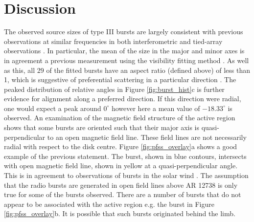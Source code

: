 
\section{Discussion}
\label{sec:obsvtheory_discussion}
The observed source sizes of type III bursts are largely consistent with previous observations at similar frequencies in both interferometric and tied-array observations \citep{Kontar2017, Zhang2020}. In particular, the mean of the size in the major and minor axes is in agreement a previous measurement using the visibility fitting method \citep{Murphy2021}. As well as this, all 29 of the fitted bursts have an aspect ratio (defined above) of less than 1, which is suggestive of preferential scattering in a particular direction \citep{Anantharamaiah1994, Bastian1994}. The peaked distribution of relative angles in Figure \ref{fig:burst_hist}c is further evidence for alignment along a preferred direction. If this direction were radial, one would expect a peak around $0^\circ$ however here a mean value of $-18.33^\circ$ is observed. An examination of the magnetic field structure of the active region shows that some bursts are oriented such that their major axis is quasi-perpendicular to an open magnetic field line. These field lines are not necessarily radial with respect to the disk centre. Figure \ref{fig:pfss_overlay}a shows a good example of the previous statement. The burst, shown in blue contours, intersects with open magnetic field line, shown in yellow at a quasi-perpendicular angle. This is in agreement to observations of bursts in the solar wind \citep{Anantharamaiah1994, SasikumarRaja2016}. The assumption that the radio bursts are generated in open field lines above AR 12738 is only true for some of the bursts observed. There are a number of bursts that do not appear to be associated with the active region e.g. the burst in Figure \ref{fig:pfss_overlay}b. It is possible that such bursts originated behind the limb. %


